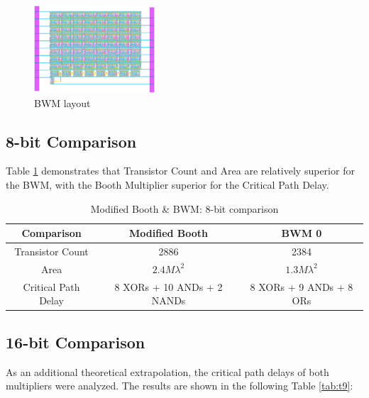 \documentclass[journal]{IEEEtran}
\begin{document}
\begin{figure}[h!]
  \centering
  \includegraphics[width=0.4\textwidth]{13.png}
  \centering
  \caption{BWM layout}
  \label{fig:13}
\end{figure}

\vspace{-10pt}

\subsection{8-bit Comparison}

Table \ref{tab:t8} demonstrates that Transistor Count and Area are relatively superior for the BWM, with the Booth Multiplier superior for the Critical Path Delay.

\begin{table}[!h]
\renewcommand{\arraystretch}{1.2}
\caption{Modified Booth \& BWM: 8-bit comparison}
\label{tab:t8}
\centering
\begin{tabular}{| c | c | c | }
\hline
\textbf{Comparison} & \textbf{Modified Booth} & 
\textbf{BWM} 0\\\hline
Transistor Count & 2886 & 2384\\\hline
Area & $2.4 M \lambda^2$ & $1.3 M \lambda^2$\\\hline
Critical Path Delay & 8 XORs + 10 ANDs + 2 NANDs 
& 8 XORs + 9 ANDs + 8 ORs\\\hline
\end{tabular}
\end{table}


\subsection{16-bit Comparison}

As an additional theoretical extrapolation, the critical path delays of both multipliers 
were analyzed. The results are shown in the following Table \ref{tab:t9}:
\end{document}
